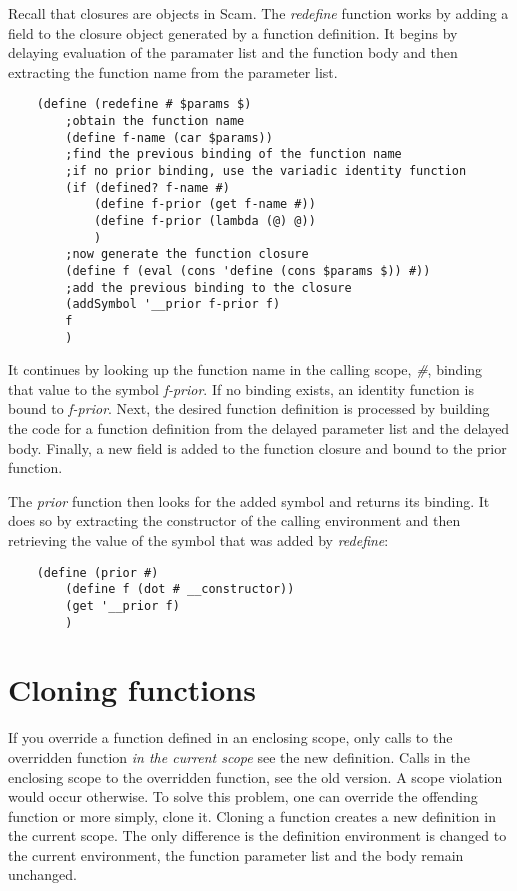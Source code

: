 Recall that closures are objects in Scam.
The {\it redefine} function works by adding a field to the closure
object generated by a function definition. It begins by
delaying evaluation of the paramater list and the function
body and then extracting the function name from the parameter list.

\begin{verbatim}
    (define (redefine # $params $)
        ;obtain the function name
        (define f-name (car $params))
        ;find the previous binding of the function name
        ;if no prior binding, use the variadic identity function 
        (if (defined? f-name #)
            (define f-prior (get f-name #))
            (define f-prior (lambda (@) @))
            )
        ;now generate the function closure
        (define f (eval (cons 'define (cons $params $)) #))
        ;add the previous binding to the closure
        (addSymbol '__prior f-prior f)
        f
        )
\end{verbatim}

It continues by looking up the function name in the calling scope, {\it \#},
binding that value to the symbol {\it f-prior}. If no binding exists,
an identity function is bound to {\it f-prior}.
Next, the desired function definition is processed by building
the code for a function definition from the delayed parameter list
and the delayed body.
Finally, a new field is added to the function closure and bound
to the prior function.

The {\it prior} function then looks for the added symbol and returns
its binding. It does so by extracting the constructor of the calling
environment and then retrieving the value of the symbol that was 
added by {\it redefine}:

\begin{verbatim}
    (define (prior #)
        (define f (dot # __constructor))
        (get '__prior f)
        )
\end{verbatim}

\section{Cloning functions}

If you override a function defined in an enclosing scope, only calls
to
the overridden function {\it in the current scope} see the new definition.
Calls in the enclosing scope to the overridden function,
see the old version. A scope violation would occur otherwise.
To solve this problem, one can override the offending function
or more simply, clone it. Cloning a function creates a new
definition in the current scope. The only difference is the
definition environment is changed to the current environment,
the function parameter list and the body remain unchanged.


